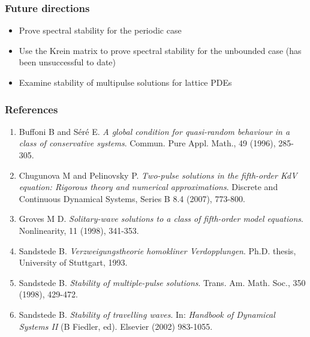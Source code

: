 \documentclass[16pt]{beamer}
\begin{document}
\begin{frame}
	\frametitle{Future directions}
	\fontsize{16}{7.2}\selectfont
	\begin{itemize}
		\item Prove spectral stability for the periodic case
		\vspace{0.5cm}
		\item Use the Krein matrix to prove spectral stability for the unbounded case (has been unsuccessful to date)
		\vspace{0.5cm}
		\item Examine stability of multipulse solutions for lattice PDEs
	\end{itemize}
\end{frame}

\begin{frame}
	\frametitle{References}
	\fontsize{12}{7.2}\selectfont
	\begin{enumerate}
		\item Buffoni B and S\'er\'e E. \emph{A global condition for quasi-random behaviour in a class of conservative systems}. Commun. Pure Appl. Math., 49 (1996), 285-305.
		\item Chugunova M and Pelinovsky P. \emph{Two-pulse solutions in the fifth-order KdV equation: Rigorous theory and numerical approximations}. Discrete and Continuous Dynamical Systems, Series B 8.4 (2007), 773-800.
		\item Groves M D. \emph{Solitary-wave solutions to a class of fifth-order model equations}. Nonlinearity, 11 (1998), 341-353.
		\item Sandstede B. \emph{Verzweigungstheorie homokliner Verdopplungen}. Ph.D. thesis, University of Stuttgart, 1993.
		\item Sandstede B. \emph{Stability of multiple-pulse solutions}. Trans. Am. Math. Soc., 350 (1998), 429-472.
		\item Sandstede B. \emph{Stability of travelling waves}. In: \emph{Handbook of Dynamical Systems II} (B Fiedler, ed). Elsevier (2002) 983-1055.
	\end{enumerate}
\end{frame}
 
\end{document}
